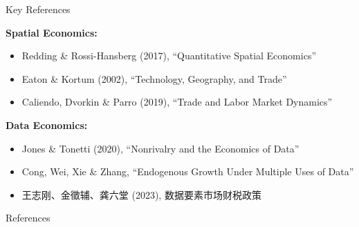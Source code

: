 \documentclass{beamer}
\begin{document}
\begin{frame}{Key References}

    \vspace{0.3em}
    {\small
    \textbf{Spatial Economics:}
    \begin{itemize}
        \item Redding \& Rossi-Hansberg (2017), ``Quantitative Spatial Economics'' \cite{ReddingRossiHansberg2017_quantitative}
        \item Eaton \& Kortum (2002), ``Technology, Geography, and Trade'' \cite{EatonKortum2002_technology}
        \item Caliendo, Dvorkin \& Parro (2019), ``Trade and Labor Market Dynamics'' \cite{CaliendoDvorkinParro2019_trade_labor}
    \end{itemize}

    \vspace{0.3em}
    \textbf{Data Economics:}
    \begin{itemize}
        \item Jones \& Tonetti (2020), ``Nonrivalry and the Economics of Data'' \cite{JonesTonetti2020_nonrivalry}
        \item Cong, Wei, Xie \& Zhang, ``Endogenous Growth Under Multiple Uses of Data'' \cite{CongWeiXieZhang_data_growth}
        \item 王志刚、金徵辅、龚六堂 (2023), 数据要素市场财税政策 \cite{WangJinGong2023_fiscal_data}
    \end{itemize}
    }

\end{frame}


\begin{frame}[allowframebreaks]{References}
    
    
\end{frame}
\end{document}
